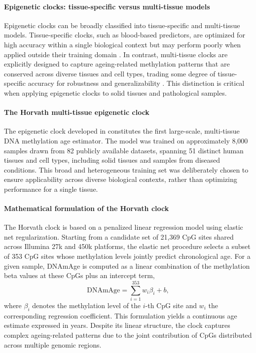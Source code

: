 \documentclass[10pt]{extarticle}
\begin{document}
\paragraph{Epigenetic clocks: tissue-specific versus multi-tissue models}
Epigenetic clocks can be broadly classified into tissue-specific and multi-tissue models. Tissue-specific clocks, such as blood-based predictors, are optimized for high accuracy within a single biological context but may perform poorly when applied outside their training domain \cite{Varshavsky2023}. In contrast, multi-tissue clocks are explicitly designed to capture ageing-related methylation patterns that are conserved across diverse tissues and cell types, trading some degree of tissue-specific accuracy for robustness and generalizability \cite{Horvath2013,Zhang2019}. This distinction is critical when applying epigenetic clocks to solid tissues and pathological samples.

\paragraph{The Horvath multi-tissue epigenetic clock}
The epigenetic clock developed in \cite{Horvath2013} constitutes the first large-scale, multi-tissue DNA methylation age estimator. The model was trained on approximately 8,000 samples drawn from 82 publicly available datasets, spanning 51 distinct human tissues and cell types, including solid tissues and samples from diseased conditions. This broad and heterogeneous training set was deliberately chosen to ensure applicability across diverse biological contexts, rather than optimizing performance for a single tissue.

\paragraph{Mathematical formulation of the Horvath clock}
The Horvath clock is based on a penalized linear regression model using elastic net regularization. Starting from a candidate set of 21,369 CpG sites shared across Illumina 27k and 450k platforms, the elastic net procedure selects a subset of 353 CpG sites whose methylation levels jointly predict chronological age. For a given sample, DNAmAge is computed as a linear combination of the methylation beta values at these CpGs plus an intercept term,
\[
\text{DNAmAge} = \sum_{i=1}^{353} w_i \beta_i + b,
\]
where $\beta_i$ denotes the methylation level of the $i$-th CpG site and $w_i$ the corresponding regression coefficient. This formulation yields a continuous age estimate expressed in years. Despite its linear structure, the clock captures complex ageing-related patterns due to the joint contribution of CpGs distributed across multiple genomic regions.
\end{document}
